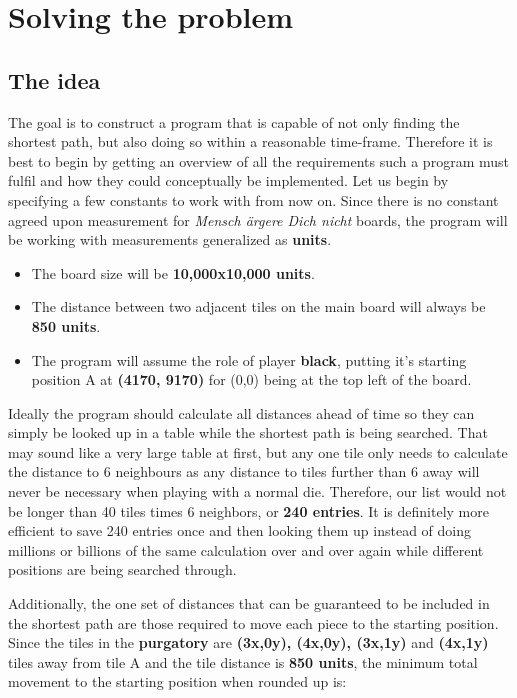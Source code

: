 \documentclass[12pt]{article}
\begin{document}
\section{Solving the problem}

\subsection{The idea}
The goal is to construct a program that is capable of not only finding the shortest path, but also doing so within a reasonable time-frame. Therefore it is best to begin by getting an overview of all the requirements such a program must fulfil and how they could conceptually be implemented. Let us begin by specifying a few constants to work with from now on. Since there is no constant agreed upon measurement for \textit{Mensch ärgere Dich nicht} boards, the program will be working with measurements generalized as \textbf{units}.
\begin{itemize}
    \item The board size will be \textbf{10,000x10,000 units}.
    \item The distance between two adjacent tiles on the main board will always be \textbf{850 units}.
    \item The program will assume the role of player \textbf{black}, putting it's starting position A at \textbf{(4170, 9170)} for (0,0) being at the top left of the board.
\end{itemize}

Ideally the program should calculate all distances ahead of time so they can simply be looked up in a table while the shortest path is being searched. That may sound like a very large table at first, but any one tile only needs to calculate the distance to 6 neighbours as any distance to tiles further than 6 away will never be necessary when playing with a normal die. Therefore, our list would not be longer than 40 tiles times 6 neighbors, or \textbf{240 entries}. It is definitely more efficient to save 240 entries once and then looking them up instead of doing millions or billions of the same calculation over and over again while different positions are being searched through.

Additionally, the one set of distances that can be guaranteed to be included in the shortest path are those required to move each piece to the starting position. Since the tiles in the \textbf{purgatory} are \textbf{(3x,0y), (4x,0y), (3x,1y)} and \textbf{(4x,1y)} tiles away from tile A and the tile distance is \textbf{850 units}, the minimum total movement to the starting position when rounded up is:
\end{document}
